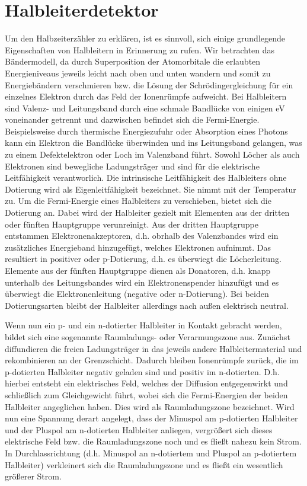\documentclass[bigchapter,colorback,accentcolor=tud4b,linedtoc,11pt]{tudreport}
\begin{document}
\section{Halbleiterdetektor}

Um den Halbzeiterzähler zu erklären, ist es sinnvoll, sich einige grundlegende Eigenschaften von Halbleitern in Erinnerung zu rufen. Wir betrachten das Bändermodell, da durch Superposition der Atomorbitale die erlaubten Energieniveaus jeweils leicht nach oben und unten wandern und somit zu Energiebändern verschmieren bzw. die Lösung der Schrödingergleichung für ein einzelnes Elektron durch das Feld der Ionenrümpfe aufweicht. Bei Halbleitern sind Valenz- und Leitungsband durch eine schmale Bandlücke von einigen eV voneinander getrennt und dazwischen befindet sich die Fermi-Energie. Beispielsweise durch thermische Energiezufuhr oder Absorption eines Photons kann ein Elektron die Bandlücke überwinden und ins Leitungsband gelangen, was zu einem Defektelektron oder Loch im Valenzband führt. Sowohl Löcher als auch Elektronen sind bewegliche Ladungsträger und sind für die elektrische Leitfähigkeit  verantworlich. Die intrinsische Leitfähigkeit des Halbleiters ohne Dotierung wird als Eigenleitfähigkeit bezeichnet. Sie nimmt mit der Temperatur zu. Um die Fermi-Energie eines Halbleiters zu verschieben, bietet sich die Dotierung an. Dabei wird der Halbleiter gezielt mit Elementen aus der dritten oder fünften Hauptgruppe verunreinigt. Aus der dritten Hauptgruppe entstammen Elektronenakzeptoren, d.h. obrhalb des Valenzbandes wird ein zusätzliches Energieband hinzugefügt, welches Elektronen aufnimmt. Das resultiert in positiver oder p-Dotierung, d.h. es überwiegt die Löcherleitung. Elemente aus der fünften Hauptgruppe dienen als Donatoren, d.h. knapp unterhalb des Leitungsbandes wird ein Elektronenspender hinzufügt und es überwiegt die Elektronenleitung (negative oder n-Dotierung). Bei beiden Dotierungsarten bleibt der Halbleiter allerdings nach außen elektrisch neutral.

Wenn nun ein p- und ein n-dotierter Halbleiter in Kontakt gebracht werden, bildet sich eine sogenannte Raumladungs- oder Verarmungszone aus. Zunächst diffundieren die freien Ladungsträger in das jeweils andere Halbleitermaterial und rekombinieren an der Grenzschicht. Dadurch bleiben Ionenrümpfe zurück, die im p-dotierten Halbleiter negativ geladen sind und positiv im n-dotierten. D.h. hierbei entsteht ein elektrisches Feld, welches der Diffusion entgegenwirkt und schließlich zum Gleichgewicht führt, wobei sich die Fermi-Energien der beiden Halbleiter angeglichen haben. Dies wird als Raumladungszone bezeichnet. Wird nun eine Spannung derart angelegt, dass der Minuspol am p-dotierten Halbleiter und der Pluspol am n-dotierten Halbleiter anliegen, vergrößert sich dieses elektrische Feld bzw. die Raumladungszone noch und es fließt nahezu kein Strom. In Durchlassrichtung (d.h. Minuspol an n-dotiertem und Pluspol an p-dotiertem Halbleiter) verkleinert sich die Raumladungszone und es fließt ein wesentlich größerer Strom.
\end{document}

